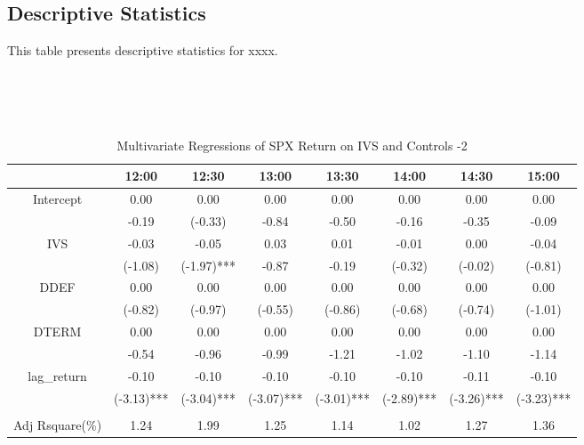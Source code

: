 \subsection{Descriptive Statistics}\label{sec:reganalysis}
This table presents descriptive statistics for xxxx. 
\begin{table}[h]
\centering
\caption{Multivariate Regressions of SPX Return on IVS and Controls -2}
\small
~\\~\\~
\label{Return-2}
\begin{tabular}{@{}cccccccc@{}}
\toprule
                & 12:00      & 12:30      & 13:00      & 13:30      & 14:00      & 14:30      & 15:00      \\ \midrule
Intercept       & 0.00       & 0.00       & 0.00       & 0.00       & 0.00       & 0.00       & 0.00       \\
                & -0.19      & (-0.33)    & -0.84      & -0.50      & -0.16      & -0.35      & -0.09      \\
IVS             & -0.03      & -0.05      & 0.03       & 0.01       & -0.01      & 0.00       & -0.04      \\
                & (-1.08)    & (-1.97)*** & -0.87      & -0.19      & (-0.32)    & (-0.02)    & (-0.81)    \\
DDEF            & 0.00       & 0.00       & 0.00       & 0.00       & 0.00       & 0.00       & 0.00       \\
                & (-0.82)    & (-0.97)    & (-0.55)    & (-0.86)    & (-0.68)    & (-0.74)    & (-1.01)    \\
DTERM           & 0.00       & 0.00       & 0.00       & 0.00       & 0.00       & 0.00       & 0.00       \\
                & -0.54      & -0.96      & -0.99      & -1.21      & -1.02      & -1.10      & -1.14      \\
lag\_return     & -0.10      & -0.10      & -0.10      & -0.10      & -0.10      & -0.11      & -0.10      \\
                & (-3.13)*** & (-3.04)*** & (-3.07)*** & (-3.01)*** & (-2.89)*** & (-3.26)*** & (-3.23)*** \\
                &            &            &            &            &            &            &            \\
Adj Rsquare(\%) & 1.24       & 1.99       & 1.25       & 1.14       & 1.02       & 1.27       & 1.36       \\ \bottomrule
\end{tabular}
\end{table}

